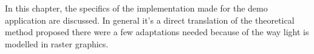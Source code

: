 
In this chapter, the specifics of the implementation made for the demo application are discussed. In general it's a direct translation of the theoretical method proposed there were a few adaptations needed because of the way light is modelled in raster graphics.